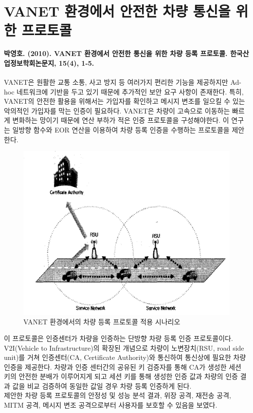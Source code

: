 \section{VANET 환경에서 안전한 차량 통신을 위한 프로토콜}
    \textbf{박영호. (2010). VANET 환경에서 안전한 통신을 위한 차량 등록 프로토콜. 한국산업정보학회논문지, 15(4), 1-5.}
    \\\\
    VANET은 원활한 교통 소통, 사고 방지 등 여러가지 편리한 기능을 제공하지만 Ad-hoc 네트워크에 기반을 두고 있기 때문에 추가적인 보안 요구 사항이 존재한다. 특히, VANET의 안전한 활용을 위해서는 가입자를 확인하고 메시지 변조를 일으킬 수 있는 악의적인 가입자를 막는 인증이 필요하다. VANET은 차량이 고속으로 이동하는 빠르게 변화하는 망이기 때문에 연산 부하가 적은 인증 프로토콜을 구성해야한다. 이 연구는 일방향 함수와 EOR 연산을 이용하여 차량 등록 인증을 수행하는 프로토콜을 제안한다. \\
    \vspace{-4mm}
        \begin{figure}[!h]\centering
    		\includegraphics[width=.65\textwidth]{image/week13/4-1.png}
    		\caption{\small VANET 환경에서의 차량 등록 프로토콜 적용 시나리오}
    		\vspace{-10pt}
        \end{figure}
    
    이 프로토콜은 인증센터가 차량을 인증하는 단방향 차량 등록 인증 프로토콜이다. V2I(Vehicle to Infrastructure)의 확장된 개념으로 차량이 노변장치(RSU, road side unit)를 거쳐 인증센터(CA, Certificate Authority)와 통신하여 통신상에 필요한 차량 인증을 제공한다. 차량과 인증 센터간의 공유된 키 검증자를 통해 CA가 생성한 세션 키의 안전한 분배가 이루어지게 되고 세션 키를 통해 생성한 인증 값과 차량의 인증 결과 값을 비교 검증하여 동일한 값일 경우 차량 등록 인증하게 된다. \\
    제안한 차량 등록 프로토콜의 안정성 및 성능 분석 결과, 위장 공격, 재전송 공격, MITM 공격, 메시지 변조 공격으로부터 사용자를 보호할 수 있음을 보였다.